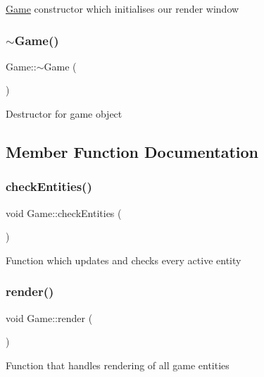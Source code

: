 \mbox{\hyperlink{class_game}{Game}} constructor which initialises our render window 

\mbox{\label{class_game_ae3d112ca6e0e55150d2fdbc704474530}} 
\subsubsection{\texorpdfstring{$\sim$Game()}{~Game()}}
{\footnotesize\ttfamily Game\+::$\sim$\+Game (\begin{DoxyParamCaption}{ }\end{DoxyParamCaption})}



Destructor for game object 



\subsection{Member Function Documentation}
\mbox{\label{class_game_a0f45755826070a27ccc98e32deca5d87}} 
\subsubsection{\texorpdfstring{checkEntities()}{checkEntities()}}
{\footnotesize\ttfamily void Game\+::check\+Entities (\begin{DoxyParamCaption}{ }\end{DoxyParamCaption})}



Function which updates and checks every active entity 

\mbox{\label{class_game_a15ddd769261d923827a3cdf41499c843}} 
\subsubsection{\texorpdfstring{render()}{render()}}
{\footnotesize\ttfamily void Game\+::render (\begin{DoxyParamCaption}{ }\end{DoxyParamCaption})}



Function that handles rendering of all game entities 

